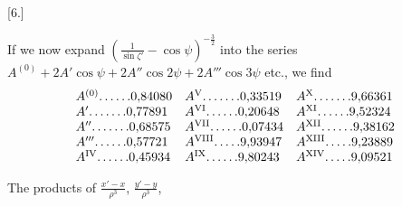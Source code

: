 \clearpage
\begingroup
{}
\renewcommand{\headrulewidth}{0pt}
\par\medskip
{}
\begin{center}[6.]\end{center}
\begingroup
\small
\par\noindent\hspace*{\parindent}If we now expand \(\left(\frac{1}{\sin\zeta'}-\cos\psi\right)^{-\frac32}\)
into the series \(A^{(0)}+2A'\cos\psi+2A''\cos2\psi+2A'''\cos3\psi\) etc., we find
\[
\begin{array}{@{}l@{\quad}l@{\quad}l@{}}
A^{(0)}\mathord{.}\,\mathord{.}\,\mathord{.}\,\mathord{.}\,\mathord{.}\,\mathord{.}0{,}84080&A^{\mathrm{V}}\mathord{.}\,\mathord{.}\,\mathord{.}\,\mathord{.}\,\mathord{.}\,\mathord{.}\,\mathord{.}0{,}33519&A^{\mathrm{X}}\mathord{.}\,\mathord{.}\,\mathord{.}\,\mathord{.}\,\mathord{.}\,\mathord{.}\,\mathord{.}9{,}66361\\
A'\mathord{.}\,\mathord{.}\,\mathord{.}\,\mathord{.}\,\mathord{.}\,\mathord{.}\,\mathord{.}0{,}77891&A^{\mathrm{VI}}\mathord{.}\,\mathord{.}\,\mathord{.}\,\mathord{.}\,\mathord{.}\,\mathord{.}0{,}20648&A^{\mathrm{XI}}\mathord{.}\,\mathord{.}\,\mathord{.}\,\mathord{.}\,\mathord{.}\,\mathord{.}9{,}52324\\
A''\mathord{.}\,\mathord{.}\,\mathord{.}\,\mathord{.}\,\mathord{.}\,\mathord{.}\,\mathord{.}0{,}68575&A^{\mathrm{VII}}\mathord{.}\,\mathord{.}\,\mathord{.}\,\mathord{.}\,\mathord{.}\,\mathord{.}0{,}07434&A^{\mathrm{XII}}\mathord{.}\,\mathord{.}\,\mathord{.}\,\mathord{.}\,\mathord{.}\,\mathord{.}9{,}38162\\
A'''\mathord{.}\,\mathord{.}\,\mathord{.}\,\mathord{.}\,\mathord{.}\,\mathord{.}0{,}57721&A^{\mathrm{VIII}}\mathord{.}\,\mathord{.}\,\mathord{.}\,\mathord{.}\,\mathord{.}9{,}93947&A^{\mathrm{XIII}}\mathord{.}\,\mathord{.}\,\mathord{.}\,\mathord{.}\,\mathord{.}9{,}23889\\
A^{\mathrm{IV}}\mathord{.}\,\mathord{.}\,\mathord{.}\,\mathord{.}\,\mathord{.}\,\mathord{.}0{,}45934&A^{\mathrm{IX}}\mathord{.}\,\mathord{.}\,\mathord{.}\,\mathord{.}\,\mathord{.}\,\mathord{.}9{,}80243&A^{\mathrm{XIV}}\mathord{.}\,\mathord{.}\,\mathord{.}\,\mathord{.}\,\mathord{.}9{,}09521
\end{array}
\]
\par\noindent\hspace*{\parindent}The products of \(\frac{x'-x}{\rho^3}\), \(\frac{y'-y}{\rho^3}\),
